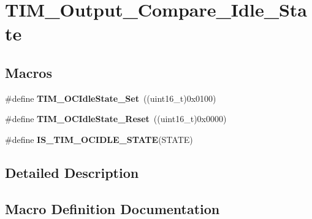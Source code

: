 \hypertarget{group___t_i_m___output___compare___idle___state}{}\section{T\+I\+M\+\_\+\+Output\+\_\+\+Compare\+\_\+\+Idle\+\_\+\+State}
\label{group___t_i_m___output___compare___idle___state}
\subsection*{Macros}
\begin{DoxyCompactItemize}
\item 
\#define {\bfseries T\+I\+M\+\_\+\+O\+C\+Idle\+State\+\_\+\+Set}~((uint16\+\_\+t)0x0100)\hypertarget{group___t_i_m___output___compare___idle___state_ga86d8f895a1ec584323f6c02c7edfad4c}{}\label{group___t_i_m___output___compare___idle___state_ga86d8f895a1ec584323f6c02c7edfad4c}

\item 
\#define {\bfseries T\+I\+M\+\_\+\+O\+C\+Idle\+State\+\_\+\+Reset}~((uint16\+\_\+t)0x0000)\hypertarget{group___t_i_m___output___compare___idle___state_gace5465bc9e90ba7862b3af9e6cc9b97e}{}\label{group___t_i_m___output___compare___idle___state_gace5465bc9e90ba7862b3af9e6cc9b97e}

\item 
\#define {\bfseries I\+S\+\_\+\+T\+I\+M\+\_\+\+O\+C\+I\+D\+L\+E\+\_\+\+S\+T\+A\+TE}(S\+T\+A\+TE)
\end{DoxyCompactItemize}


\subsection{Detailed Description}


\subsection{Macro Definition Documentation}
